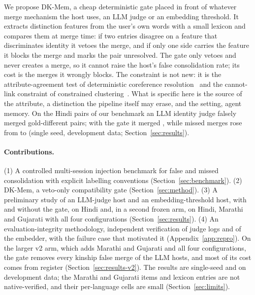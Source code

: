 We propose DK-Mem, a cheap deterministic gate placed in front of whatever merge mechanism the host uses, an LLM judge or an embedding
threshold. It extracts distinction features from the user's own words with a small lexicon and compares them at merge time: if two entries
disagree on a feature that discriminates identity it vetoes the merge, and if only one side carries the feature it blocks the merge and
marks the pair unresolved. The gate only vetoes and never creates a merge, so it cannot raise the host's false consolidation rate; its cost
is the merges it wrongly blocks. The constraint is not new: it is the attribute-agreement test of deterministic coreference
resolution~\citep{raghunathan2010sieve,lee2013deterministic} and the cannot-link constraint of constrained
clustering~\citep{wagstaff2001constrained}. What is specific here is the source of the attribute, a distinction the pipeline itself may
erase, and the setting, agent memory. On the Hindi pairs of our benchmark an LLM identity judge falsely merged \MainCoffHiFCR{}
gold-different pairs; with the gate it merged \MainClexHiFCR{}, while missed merges rose from \MainCoffHiMCR{} to \MainClexHiMCR{} (single
seed, development data; Section~\ref{sec:results}).

\paragraph{Contributions.}
(1) A controlled multi-session injection benchmark for false and missed consolidation with explicit labelling conventions
(Section~\ref{sec:benchmark}).
(2) DK-Mem, a veto-only compatibility gate (Section~\ref{sec:method}).
(3) A preliminary study of an LLM-judge host and an embedding-threshold host, with and without the gate, on Hindi and, in a
second frozen arm, on Hindi, Marathi and Gujarati with all four configurations (Section~\ref{sec:results}).
(4) An evaluation-integrity methodology, independent verification of judge logs and of the embedder, with the failure case that motivated
it (Appendix~\ref{app:repro}).
On the larger v2 arm, which adds Marathi and Gujarati and all four configurations, the gate removes every kinship false merge of the LLM
hosts, and most of its cost comes from register (Section~\ref{sec:results-v2}). The results are single-seed and on development data; the
Marathi and Gujarati items and lexicon entries are not native-verified, and their per-language cells are small (Section~\ref{sec:limits}).
